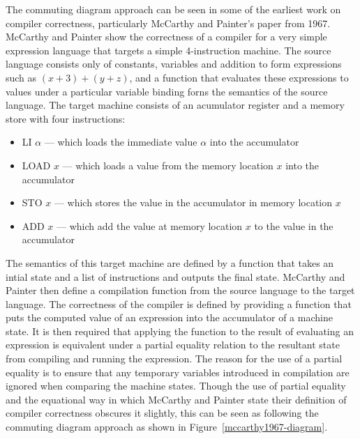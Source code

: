 \documentclass[a4paper,12pt]{article}
\begin{document}
The commuting diagram approach can be seen in some of the earliest work on compiler correctness, particularly McCarthy and Painter's paper from 1967\cite{mccarthy1967}.
McCarthy and Painter show the correctness of a compiler for a very simple expression language that targets a simple 4-instruction machine.
The source language consists only of constants, variables and addition to form expressions such as $(x + 3) + (y + z)$, and a function that evaluates these expressions to values under a particular variable binding forns the semantics of the source language.
The target machine consists of an acumulator register and a memory store with four instructions:
\begin{itemize}
  \item LI $\alpha$ --- which loads the immediate value $\alpha$ into the accumulator
  \item LOAD $x$ --- which loads a value from the memory location $x$ into the accumulator
  \item STO $x$ --- which stores the value in the accumulator in memory location $x$
  \item ADD $x$ --- which add the value at memory location $x$ to the value in the accumulator
\end{itemize}
The semantics of this target machine are defined by a function that takes an intial state and a list of instructions and outputs the final state.
McCarthy and Painter then define a compilation function from the source language to the target language.
The correctness of the compiler is defined by providing a function that puts the computed value of an expression into the accumulator of a machine state. 
It is then required that applying the function to the result of evaluating an expression is equivalent under a partial equality relation to the resultant state from compiling and running the expression.
The reason for the use of a partial equality is to ensure that any temporary variables introduced in compilation are ignored when comparing the machine states.
Though the use of partial equality and the equational way in which McCarthy and Painter state their definition of compiler correctness obscures it slightly, this can be seen as following the commuting diagram approach as shown in Figure~\ref{mccarthy1967-diagram}.
\end{document}
